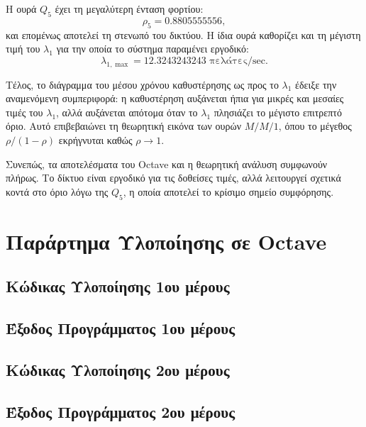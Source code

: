 \documentclass{article}
\begin{document}
Η ουρά $Q_5$ έχει τη μεγαλύτερη ένταση φορτίου:
\[
    \rho_5 = 0.8805555556,
\]
και επομένως αποτελεί τη στενωπό του δικτύου. Η ίδια ουρά καθορίζει και τη μέγιστη τιμή του $\lambda_1$ για την οποία το σύστημα παραμένει εργοδικό:
\[
    \lambda_{1,\max} = 12.3243243243 \text{ πελάτες/sec}.
\]

Τέλος, το διάγραμμα του μέσου χρόνου καθυστέρησης ως προς το $\lambda_1$ έδειξε την αναμενόμενη συμπεριφορά: η καθυστέρηση αυξάνεται ήπια για μικρές και μεσαίες τιμές του $\lambda_1$, αλλά αυξάνεται απότομα όταν το $\lambda_1$ πλησιάζει το μέγιστο επιτρεπτό όριο. Αυτό επιβεβαιώνει τη θεωρητική εικόνα των ουρών $M/M/1$, όπου το μέγεθος $\rho/(1-\rho)$ εκρήγνυται καθώς $\rho \to 1$.

Συνεπώς, τα αποτελέσματα του Octave και η θεωρητική ανάλυση συμφωνούν πλήρως. Το δίκτυο είναι εργοδικό για τις δοθείσες τιμές, αλλά λειτουργεί σχετικά κοντά στο όριο λόγω της $Q_5$, η οποία αποτελεί το κρίσιμο σημείο συμφόρησης.

\newpage
\section{Παράρτημα Υλοποίησης σε Octave}

\subsection{Κώδικας Υλοποίησης 1ου μέρους}


\subsection{Έξοδος Προγράμματος 1ου μέρους}


\subsection{Κώδικας Υλοποίησης 2ου μέρους}


\subsection{Έξοδος Προγράμματος 2ου μέρους}

\end{document}
